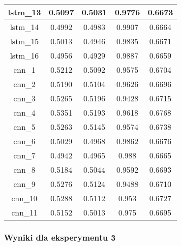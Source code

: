 \begin{table}[]
\begin{tabular}{|c|c|c|c|c|}
        lstm\_13 & 0.5097                       & 0.5031      & 0.9776 & 0.6673 \\ \hline
        lstm\_14 & 0.4992                       & 0.4983      & 0.9907 & 0.6664 \\ \hline
        lstm\_15 & 0.5013                       & 0.4946      & 0.9835 & 0.6671 \\ \hline
        lstm\_16 & 0.4956                       & 0.4929      & 0.9887 & 0.6659 \\ \hline
        cnn\_1   & 0.5212                       & 0.5092      & 0.9575 & 0.6704 \\ \hline
        cnn\_2   & 0.5190                       & 0.5104      & 0.9626 & 0.6696 \\ \hline
        cnn\_3   & 0.5265                       & 0.5196      & 0.9428 & 0.6715 \\ \hline
        cnn\_4   & 0.5351                       & 0.5193      & 0.9618 & 0.6768 \\ \hline
        cnn\_5   & 0.5263                       & 0.5145      & 0.9574 & 0.6738 \\ \hline
        cnn\_6   & 0.5029                       & 0.4968      & 0.9862 & 0.6676 \\ \hline
        cnn\_7   & 0.4942                       & 0.4965      & 0.988  & 0.6665 \\ \hline
        cnn\_8   & 0.5184                       & 0.5044      & 0.9592 & 0.6693 \\ \hline
        cnn\_9   & 0.5276                       & 0.5124      & 0.9488 & 0.6710 \\ \hline
        cnn\_10  & 0.5288                       & 0.5112      & 0.953  & 0.6727 \\ \hline
        cnn\_11  & 0.5152                       & 0.5013      & 0.975  & 0.6695 \\ \hline
    \end{tabular}
\end{table}

\newpage %
\subsubsection{\label{wyniki_eksperymentow_eks_3}Wyniki dla eksperymentu 3}


